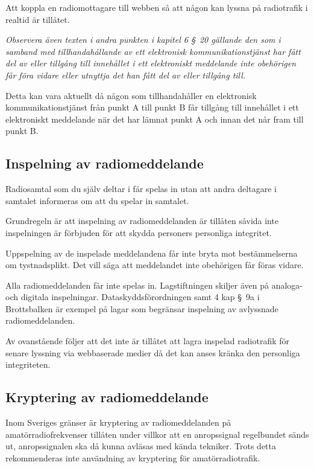 Att koppla en radiomottagare till webben så att någon kan lyssna på radiotrafik
i realtid är tillåtet.

\emph{Observera även texten i andra punkten i kapitel 6 \S~20 gällande den som i
	samband med tillhandahållande av ett elektronisk kommunikationstjänst har fått
	del av eller tillgång till innehållet i ett elektroniskt meddelande inte
	obehörigen får föra vidare eller utnyttja det han fått del av eller tillgång
	till.}

Detta kan vara aktuellt då någon som tillhandahåller en elektronisk
kommunikationstjänst från punkt A till punkt B får tillgång till innehållet i
ett elektroniskt meddelande när det har lämnat punkt A och innan det når fram
till punkt B.

\subsection{Inspelning av radiomeddelande}

Radiosamtal som du själv deltar i får spelas in utan att andra deltagare i
samtalet informeras om att du spelar in samtalet.

Grundregeln är att inspelning av radiomeddelanden är tillåten såvida inte
inspelningen är förbjuden för att skydda personers personliga integritet.

Uppspelning av de inspelade meddelandena får inte bryta mot bestämmelserna om
tystnadsplikt.
Det vill säga att meddelandet inte obehörigen får föras vidare.

Alla radiomeddelanden får inte spelas in.
Lagstiftningen skiljer även på analoga- och digitala inspelningar.
Dataskyddsförordningen \cite{GDPR} samt 4 kap \S~9a i
Brottsbalken \cite{SFS1962:700} är exempel på lagar som begränsar inspelning av
avlyssnade radiomeddelanden.

Av ovanstående följer att det inte är tillåtet att lagra inspelad radiotrafik
för senare lyssning via webbaserade medier då det kan anses kränka den
personliga integriteten.

\subsection{Kryptering av radiomeddelande}
\label{kryptering av radiomeddelande}

Inom Sveriges gränser är kryptering av radiomeddelanden på amatörradiofrekvenser
tillåten under villkor att en anropssignal regelbundet sänds ut, anropssignalen
ska då kunna avläsas med kända tekniker.
Trots detta rekommenderas inte användning av kryptering för amatörradiotrafik.

